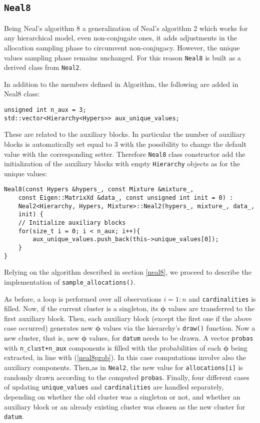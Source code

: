 \subsection{\texttt{Neal8}}

Being Neal's algorithm 8 a generalization of Neal's algorithm 2 which works for any hierarchical model, even non-conjugate ones, it adds adjustments in the allocation sampling phase to circumvent non-conjugacy.
However, the unique values sampling phase remains unchanged. For this reason \verb|Neal8| is built as a derived class from \verb|Neal2|.

In addition to the members defined in Algorithm, the following are added in Neal8 class:
\begin{verbatim}
unsigned int n_aux = 3;
std::vector<Hierarchy<Hypers>> aux_unique_values;
\end{verbatim}
These are related to the auxiliary blocks. In particular the number of auxiliary blocks is automatically set equal to 3 with the possibility to change the default value with the corresponding setter.
Therefore \verb|Neal8| class constructor add the initialization of the auxiliary blocks with empty \verb|Hierarchy| objects as for the unique values:
\begin{verbatim}
Neal8(const Hypers &hypers_, const Mixture &mixture_,
    const Eigen::MatrixXd &data_, const unsigned int init = 0) :
    Neal2<Hierarchy, Hypers, Mixture>::Neal2(hypers_, mixture_, data_,
    init) {
    // Initialize auxiliary blocks
    for(size_t i = 0; i < n_aux; i++){
        aux_unique_values.push_back(this->unique_values[0]);
    }
}

\end{verbatim}



Relying on the algorithm described in section \ref{neal8}, we proceed to describe the implementation of \verb|sample_allocations()|.

As before, a loop is performed over all observations $i=1:n$ and \verb|cardinalities| is filled. Now, if the current cluster is a singleton, its $\boldsymbol\phi$ values are transferred to the first auxiliary block. Then, each auxiliary block (except the first one if the above case occurred) generates new $\boldsymbol\phi$ values via the hierarchy's \verb|draw()| function. Now a new cluster, that is, new $\boldsymbol\phi$ values, for \verb|datum| needs to be drawn. 	A vector \verb|probas| with \verb|n_clust+n_aux| components is filled with the probabilities of each $\boldsymbol\phi$ being extracted, in line with (\ref{neal8prob}). In this case computations involve also the auxiliary components. Then,as in \verb|Neal2|, the new value for \verb|allocations[i]| is randomly drawn according to the computed \verb|probas|. Finally, four different cases of updating \verb|unique_values| and \verb|cardinalities| are handled separately, depending on whether the old cluster was a singleton or not, and whether an auxiliary block or an already existing cluster was chosen as the new cluster for \verb|datum|.
